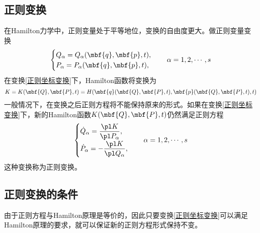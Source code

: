 \subsection{正则变换}

在Hamilton力学中，正则变量处于平等地位，变换的自由度更大。做正则变量变换
\begin{equation}
	\begin{cases}
		Q_\alpha = Q_\alpha(\mbf{q},\mbf{p},t), \\
		P_\alpha = P_\alpha(\mbf{q},\mbf{p},t),
	\end{cases}\quad \alpha = 1,2,\cdots,s
	\label{正则坐标变换}
\end{equation}
在变换\eqref{正则坐标变换}下，Hamilton函数将变换为
\begin{equation*}
	K = K(\mbf{Q},\mbf{P},t) = H(\mbf{q}(\mbf{Q},\mbf{P},t),\mbf{p}(\mbf{Q},\mbf{P},t),t)
\end{equation*}
一般情况下，在变换之后正则方程将不能保持原来的形式。如果在变换\eqref{正则坐标变换}下，新的Hamilton函数$K(\mbf{Q},\mbf{P},t)$仍然满足正则方程
\begin{equation*}
	\begin{cases}
		\displaystyle \dot{Q}_\alpha = \frac{\pl K}{\pl P_\alpha}, \\[1.5ex]
		\displaystyle \dot{P}_\alpha = -\frac{\pl K}{\pl Q_\alpha},
	\end{cases}\quad \alpha =1,2,\cdots,s
\end{equation*}
这种变换称为{\heiti 正则变换}。

\subsection{正则变换的条件}

由于正则方程与Hamilton原理是等价的，因此只要变换\eqref{正则坐标变换}可以满足Hamilton原理的要求，就可以保证新的正则方程形式保持不变。

